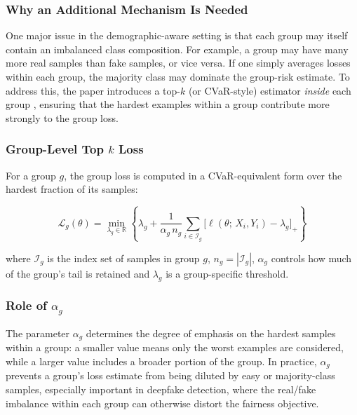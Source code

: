 \subsubsection{Why an Additional Mechanism Is Needed}
\label{subsec:topk_motivation}

One major issue in the demographic-aware setting is that each group may itself contain an imbalanced class composition. For example, a group may have many more real samples than fake samples, or vice versa. If one simply averages losses within each group, the majority class may dominate the group-risk estimate. To address this, the paper introduces a top-$k$ (or CVaR-style) estimator \emph{inside} each group \cite{dag_paper}, ensuring that the hardest examples within a group contribute more strongly to the group loss.

\subsubsection{Group-Level Top \texorpdfstring{$k$}{k} Loss}
\label{subsec:topk_loss}

For a group $g$, the group loss is computed in a CVaR-equivalent form over the hardest fraction of its samples:

\begin{equation}
    \mathcal{L}_g(\theta)
    = \min_{\lambda_g \in \mathbb{R}}
      \left\{
        \lambda_g
        + \frac{1}{\alpha_g\, n_g}
          \sum_{i \in \mathcal{I}_g}
          \bigl[\ell(\theta;\,X_i,Y_i) - \lambda_g\bigr]_{+}
      \right\}
    \label{eq:group_topk}
\end{equation}

\noindent where $\mathcal{I}_g$ is the index set of samples in group $g$, $n_g = |\mathcal{I}_g|$, $\alpha_g$ controls how much of the group's tail is retained and $\lambda_g$ is a group-specific threshold.

\subsubsection{Role of \texorpdfstring{$\alpha_g$}{alpha\_g}}
\label{subsec:alpha_g_role}

The parameter $\alpha_g$ determines the degree of emphasis on the hardest samples within a group: a smaller value means only the worst examples are considered, while a larger value includes a broader portion of the group. In practice, $\alpha_g$ prevents a group's loss estimate from being diluted by easy or majority-class samples, especially important in deepfake detection, where the real/fake imbalance within each group can otherwise distort the fairness objective.

